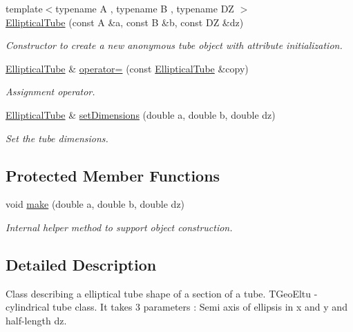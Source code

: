 \begin{DoxyCompactItemize}
{\footnotesize template$<$typename A , typename B , typename DZ $>$ }\\\hyperlink{class_d_d4hep_1_1_geometry_1_1_elliptical_tube_ab65f044778bd07acdd8114ee41052437}{EllipticalTube} (const A \&a, const B \&b, const DZ \&dz)
\begin{DoxyCompactList}\small\item\em Constructor to create a new anonymous tube object with attribute initialization. \item\end{DoxyCompactList}\item 
\hyperlink{class_d_d4hep_1_1_geometry_1_1_elliptical_tube}{EllipticalTube} \& \hyperlink{class_d_d4hep_1_1_geometry_1_1_elliptical_tube_a4488c10cca4a3d2f44757f86da62124e}{operator=} (const \hyperlink{class_d_d4hep_1_1_geometry_1_1_elliptical_tube}{EllipticalTube} \&copy)
\begin{DoxyCompactList}\small\item\em Assignment operator. \item\end{DoxyCompactList}\item 
\hyperlink{class_d_d4hep_1_1_geometry_1_1_elliptical_tube}{EllipticalTube} \& \hyperlink{class_d_d4hep_1_1_geometry_1_1_elliptical_tube_a65ee98dd3ac38b6158fa55443919c0f5}{setDimensions} (double a, double b, double dz)
\begin{DoxyCompactList}\small\item\em Set the tube dimensions. \item\end{DoxyCompactList}\end{DoxyCompactItemize}
\subsection*{Protected Member Functions}
\begin{DoxyCompactItemize}
\item 
void \hyperlink{class_d_d4hep_1_1_geometry_1_1_elliptical_tube_a33fcff3b6382c727153417bb115bacb9}{make} (double a, double b, double dz)
\begin{DoxyCompactList}\small\item\em Internal helper method to support object construction. \item\end{DoxyCompactList}\end{DoxyCompactItemize}


\subsection{Detailed Description}
Class describing a elliptical tube shape of a section of a tube. TGeoEltu -\/ cylindrical tube class. It takes 3 parameters : Semi axis of ellipsis in x and y and half-\/length dz.

